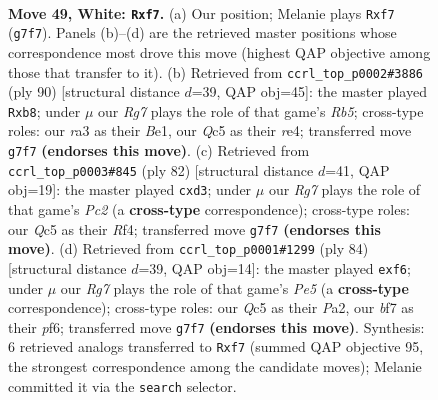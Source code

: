 \documentclass[11pt]{article}
\begin{document}
\clearpage

\begin{figure}[p]\centering
\begin{subfigure}{0.46\textwidth}\centering
\resizebox{\linewidth}{!}{%
\newchessgame
\chessboard[
  setfen={3k4/5bR1/8/2QP4/8/r5p1/P1P1p1P1/4K3 w - - 7 49},
  showmover=false,
  pgfstyle=straightmove, color=movearrow, markmove={g7-f7}
]}
\caption{}
\end{subfigure}\hfill
\begin{subfigure}{0.46\textwidth}\centering
\resizebox{\linewidth}{!}{%
\newchessgame
\chessboard[
  setfen={1b6/5p1k/8/1R2P3/4r2p/7P/6K1/4B3 w - - 4 46},
  showmover=false,
  pgfstyle=straightmove, color=movearrow, markmove={b5-b8}
]}
\caption{}
\end{subfigure}
\\[4pt]
\begin{subfigure}{0.46\textwidth}\centering
\resizebox{\linewidth}{!}{%
\newchessgame
\chessboard[
  setfen={1k6/1p6/8/p7/P4R1p/3b3P/1PP3r1/K7 w - - 0 42},
  showmover=false,
  pgfstyle=straightmove, color=movearrow, markmove={c2-d3}
]}
\caption{}
\end{subfigure}\hfill
\begin{subfigure}{0.46\textwidth}\centering
\resizebox{\linewidth}{!}{%
\newchessgame
\chessboard[
  setfen={8/1R6/4ppk1/4P3/1p5r/1P1K3P/P7/8 w - - 0 43},
  showmover=false,
  pgfstyle=straightmove, color=movearrow, markmove={e5-f6}
]}
\caption{}
\end{subfigure}
\caption{\textbf{Move 49, White: \texttt{Rxf7}.} (a) Our position; Melanie plays \texttt{Rxf7} (\texttt{g7f7}). Panels (b)--(d) are the retrieved master positions whose correspondence most drove this move (highest QAP objective among those that transfer to it). (b) Retrieved from \texttt{ccrl\_top\_p0002\#3886} (ply 90) [structural distance $d$=39, QAP obj=45]: the master played \texttt{Rxb8}; under $\mu$ our \emph{Rg7} plays the role of that game's \emph{Rb5}; cross-type roles: our \emph{r}a3 as their \emph{B}e1, our \emph{Q}c5 as their \emph{r}e4; transferred move \texttt{g7f7} \textbf{(endorses this move)}. (c) Retrieved from \texttt{ccrl\_top\_p0003\#845} (ply 82) [structural distance $d$=41, QAP obj=19]: the master played \texttt{cxd3}; under $\mu$ our \emph{Rg7} plays the role of that game's \emph{Pc2} (a \textbf{cross-type} correspondence); cross-type roles: our \emph{Q}c5 as their \emph{R}f4; transferred move \texttt{g7f7} \textbf{(endorses this move)}. (d) Retrieved from \texttt{ccrl\_top\_p0001\#1299} (ply 84) [structural distance $d$=39, QAP obj=14]: the master played \texttt{exf6}; under $\mu$ our \emph{Rg7} plays the role of that game's \emph{Pe5} (a \textbf{cross-type} correspondence); cross-type roles: our \emph{Q}c5 as their \emph{P}a2, our \emph{b}f7 as their \emph{p}f6; transferred move \texttt{g7f7} \textbf{(endorses this move)}. Synthesis: 6 retrieved analogs transferred to \texttt{Rxf7} (summed QAP objective 95, the strongest correspondence among the candidate moves); Melanie committed it via the \texttt{search} selector.}
\label{fig:thought-m96}
\end{figure}
\end{document}
